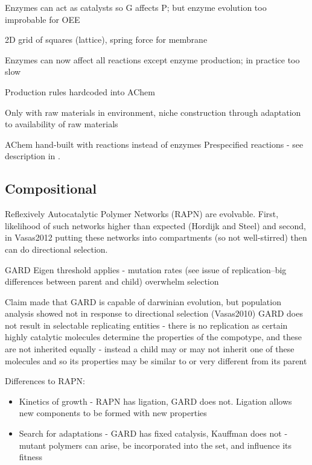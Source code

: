 Enzymes can act as catalysts so G affects P; but enzyme evolution too improbable for OEE

2D grid of squares (lattice), spring force for membrane

Enzymes can now affect all reactions except enzyme production; in practice too slow

Production rules hardcoded into AChem

Only with raw materials in environment, niche construction through adaptation to availability of raw materials

AChem hand-built with reactions instead of enzymes
Prespecified reactions - see description in \cite[p.49]{Faulconbridge2011}.

\subsection{Compositional}

\cite{Kauffman1986}
Reflexively Autocatalytic Polymer Networks (RAPN) are evolvable. First, likelihood of such networks higher than expected (Hordijk and Steel) and second, in Vasas2012 putting these networks into compartments (so not well-stirred) then can do directional selection.

GARD \parencite{Segre1998}
Eigen threshold applies - mutation rates (see issue of replication--big differences between parent and child) overwhelm selection \parencite{Vasas2015, Vasas2012, Vasas2012a}

Claim made that GARD is capable of darwinian evolution, but population analysis showed not in response to directional selection (Vasas2010) \parencite{Vasas2015, Vasas2012, Vasas2012a}
GARD does not result in selectable replicating entities - there is no replication as certain highly catalytic molecules determine the properties of the compotype, and these are not inherited equally - instead a child may or may not inherit one of these molecules and so its properties may be similar to or very different from its parent \parencite{Vasas2015, Vasas2012, Vasas2012a}

Differences to RAPN:
\begin{itemize}
	\item Kinetics of growth - RAPN has ligation, GARD does not. Ligation allows new components to be formed with new properties
	\item Search for adaptations - GARD has fixed catalysis, Kauffman does not - mutant polymers can arise, be incorporated into the set, and influence its fitness
\end{itemize}

